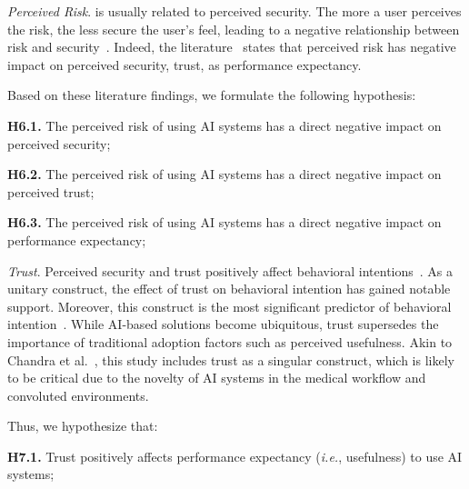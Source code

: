 \vspace{2.25mm}

{\it Perceived Risk}. is usually related to perceived security.
The more a user perceives the risk, the less secure the user's feel, leading to a negative relationship between risk and security~\cite{KHALILZADEH2017460}.
Indeed, the literature~\cite{SHIN20091343, Thakur2014} states that perceived risk has negative impact on perceived security, trust, as performance expectancy.

\vspace{2.25mm}

\noindent
Based on these literature findings, we formulate the following hypothesis:

\vspace{2.25mm}

\noindent
{\bf H6.1.} The perceived risk of using AI systems has a direct negative impact on perceived security;

\vspace{2.25mm}

\noindent
{\bf H6.2.} The perceived risk of using AI systems has a direct negative impact on perceived trust;

\vspace{2.25mm}

\noindent
{\bf H6.3.} The perceived risk of using AI systems has a direct negative impact on performance expectancy;

\vspace{2.25mm}

{\it Trust}. Perceived security and trust positively affect behavioral intentions~\cite{SHIN20091343}.
As a unitary construct, the effect of trust on behavioral intention has gained notable support.
Moreover, this construct is the most significant predictor of behavioral intention~\cite{chandra2010evaluating, SHIN20091343}.
While AI-based solutions become ubiquitous, trust supersedes the importance of traditional adoption factors such as perceived usefulness.
Akin to Chandra et al.~\cite{chandra2010evaluating}, this study includes trust as a singular construct, which is likely to be critical due to the novelty of AI systems in the medical workflow and convoluted environments.

\vspace{2.25mm}

\noindent
Thus, we hypothesize that:

\vspace{2.25mm}

\noindent
{\bf H7.1.} Trust positively affects performance expectancy ({\it i.e.}, usefulness) to use AI systems;

